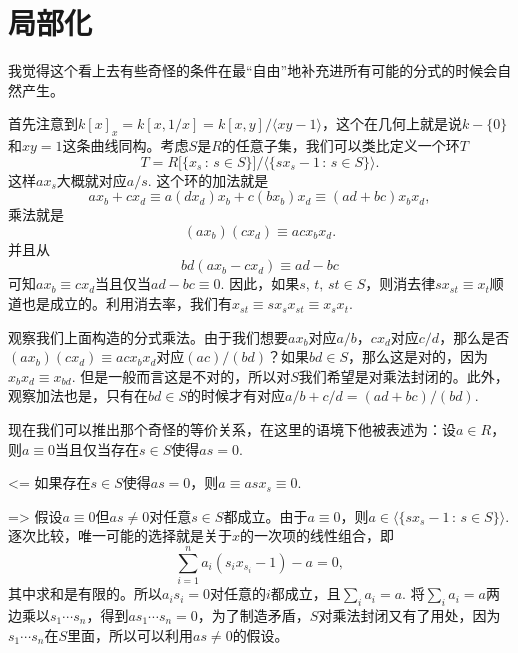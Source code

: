 \section{局部化}

我觉得这个看上去有些奇怪的条件在最“自由”地补充进所有可能的分式的时候会自然产生。

首先注意到$k[x]_x=k[x,1/x]=k[x,y]/\langle xy-1\rangle$，这个在几何上就是说$k-\{0\}$和$xy=1$这条曲线同构。考虑$S$是$R$的任意子集，我们可以类比定义一个环$T$
\[
T=R\bigl[\{x_s\,:\, s\in S\}\bigr]/\bigl\langle\{sx_s-1\,:\, s\in S\}\bigr\rangle.
\]
这样$ax_s$大概就对应$a/s$. 这个环的加法就是
\[
ax_{b}+cx_d\equiv a(dx_d)x_{b}+c(bx_{b})x_d\equiv (ad+bc)x_bx_d,
\]
乘法就是
\[
(ax_{b})(cx_d)\equiv acx_bx_d.
\]
并且从
\[
bd(ax_{b}-cx_d)\equiv ad-bc
\]
可知$ax_{b}\equiv cx_d$当且仅当$ad-bc\equiv 0$. 因此，如果$s,\,t,\,st\in S$，则消去律$sx_{st}\equiv x_t$顺道也是成立的。利用消去率，我们有$x_{st}\equiv sx_s x_{st}\equiv  x_s x_t$.

观察我们上面构造的分式乘法。由于我们想要$ax_b$对应$a/b$，$cx_d$对应$c/d$，那么是否$(ax_{b})(cx_d)\equiv acx_bx_d$对应$(ac)/(bd)$？如果$bd\in S$，那么这是对的，因为$x_bx_d\equiv x_{bd}$. 但是一般而言这是不对的，所以对$S$我们希望是对乘法封闭的。此外，观察加法也是，只有在$bd\in S$的时候才有对应$a/b+c/d=(ad+bc)/(bd)$.

现在我们可以推出那个奇怪的等价关系，在这里的语境下他被表述为：设$a\in R$，则$a\equiv 0$当且仅当存在$s \in S$使得$as=0$.

<= 如果存在$s \in S$使得$as=0$，则$a\equiv asx_s\equiv 0$. 

=> 假设$a\equiv 0$但$as\neq 0$对任意$s\in S$都成立。由于$a\equiv 0$，则$a\in \bigl\langle\{sx_s-1\,:\, s\in S\}\bigr\rangle$.逐次比较，唯一可能的选择就是关于$x$的一次项的线性组合，即
\[
\sum_{i=1}^n a_i(s_ix_{s_i}-1)-a=0,
\]其中求和是有限的。所以$a_is_i=0$对任意的$i$都成立，且$\sum_i a_i=a$. 将$\sum_i a_i=a$两边乘以$s_1\cdots s_n$，得到$as_1\cdots s_n=0$，为了制造矛盾，$S$对乘法封闭又有了用处，因为$s_1\cdots s_n$在$S$里面，所以可以利用$as\neq 0$的假设。
